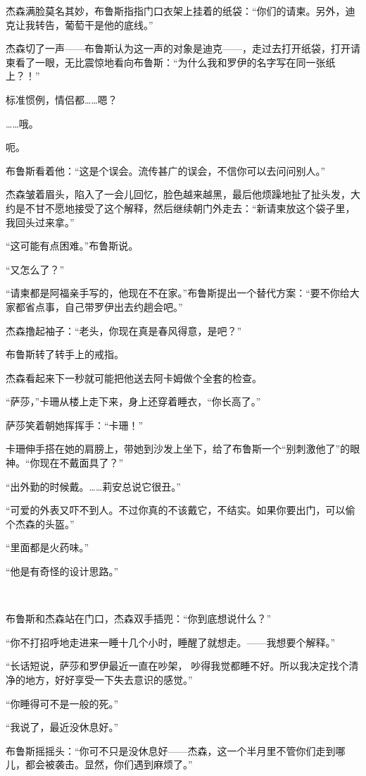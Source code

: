 \documentclass[../main]{subfiles}
\begin{document}
杰森满脸莫名其妙，布鲁斯指指门口衣架上挂着的纸袋：“你们的请柬。另外，迪克让我转告，葡萄干是他的底线。”

杰森切了一声——布鲁斯认为这一声的对象是迪克——，走过去打开纸袋，打开请柬看了一眼，无比震惊地看向布鲁斯：“为什么我和罗伊的名字写在同一张纸上？！”

标准惯例，情侣都……嗯？

……哦。

呃。

布鲁斯看着他：“这是个误会。流传甚广的误会，不信你可以去问问别人。”

杰森皱着眉头，陷入了一会儿回忆，脸色越来越黑，最后他烦躁地扯了扯头发，大约是不甘不愿地接受了这个解释，然后继续朝门外走去：“新请柬放这个袋子里，我回头过来拿。”

“这可能有点困难。”布鲁斯说。

“又怎么了？”

“请柬都是阿福亲手写的，他现在不在家。”布鲁斯提出一个替代方案：“要不你给大家都省点事，自己带罗伊出去约趟会吧。”

杰森撸起袖子：“老头，你现在真是春风得意，是吧？”

布鲁斯转了转手上的戒指。

杰森看起来下一秒就可能把他送去阿卡姆做个全套的检查。

“萨莎，”卡珊从楼上走下来，身上还穿着睡衣，“你长高了。”

萨莎笑着朝她挥挥手：“卡珊！”

卡珊伸手搭在她的肩膀上，带她到沙发上坐下，给了布鲁斯一个“别刺激他了”的眼神。“你现在不戴面具了？”

“出外勤的时候戴。……莉安总说它很丑。”

“可爱的外表又吓不到人。不过你真的不该戴它，不结实。如果你要出门，可以偷个杰森的头盔。”

“里面都是火药味。”

“他是有奇怪的设计思路。”

~\

布鲁斯和杰森站在门口，杰森双手插兜：“你到底想说什么？”

“你不打招呼地走进来一睡十几个小时，睡醒了就想走。——我想要个解释。”

“长话短说，萨莎和罗伊最近一直在吵架，
吵得我觉都睡不好。所以我决定找个清净的地方，好好享受一下失去意识的感觉。”

“你睡得可不是一般的死。”

“我说了，最近没休息好。”

布鲁斯摇摇头：“你可不只是没休息好——杰森，这一个半月里不管你们走到哪儿，都会被袭击。显然，你们遇到麻烦了。”
\end{document}
